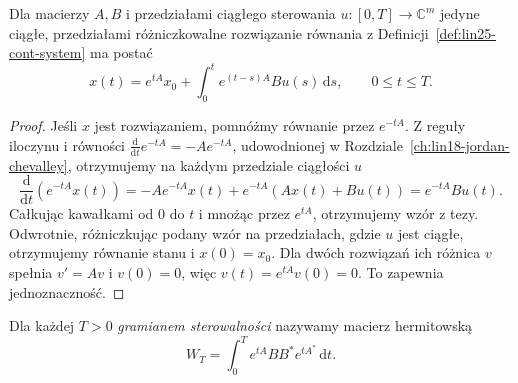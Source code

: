 \begin{lemat}
\label{lem:lin25-variation}
Dla macierzy \(A,B\)
i przedziałami ciągłego sterowania
\(u\colon[0,T]\to\mathbb C^m\)
jedyne ciągłe,
przedziałami różniczkowalne
rozwiązanie równania
z Definicji~\ref{def:lin25-cont-system}
ma postać
\[
 x(t)=e^{tA}x_0+
      \int_0^t e^{(t-s)A}Bu(s)
      \,\mathrm ds,\qquad 0\le t\le T.
\]
\end{lemat}
\begin{proof}
Jeśli \(x\) jest rozwiązaniem,
pomnóżmy równanie
przez \(e^{-tA}\).
Z reguły iloczynu
i równości
\(\frac{\mathrm d}{\mathrm dt}e^{-tA}
 =-Ae^{-tA}\),
udowodnionej w
Rozdziale~\ref{ch:lin18-jordan-chevalley},
otrzymujemy na każdym przedziale
ciągłości \(u\)
\[
 \frac{\mathrm d}{\mathrm dt}
    (e^{-tA}x(t))
 =-Ae^{-tA}x(t)+e^{-tA}(Ax(t)+Bu(t))
 =e^{-tA}Bu(t).
\]
Całkując kawałkami od \(0\) do \(t\)
i mnożąc przez \(e^{tA}\),
otrzymujemy wzór z tezy.
Odwrotnie, różniczkując
podany wzór na przedziałach,
gdzie \(u\) jest ciągłe,
otrzymujemy równanie stanu
i \(x(0)=x_0\).
Dla dwóch rozwiązań
ich różnica \(v\)
spełnia \(v'=Av\) i \(v(0)=0\),
więc \(v(t)=e^{tA}v(0)=0\).
To zapewnia jednoznaczność.
\end{proof}

\begin{definicja}
\label{def:lin25-gramian}
Dla każdej \(T>0\)
\emph{gramianem sterowalności}
nazywamy macierz hermitowską
\[
 W_T=\int_0^T
      e^{tA}BB^*e^{tA^*}
      \,\mathrm dt.
\]
\end{definicja}

